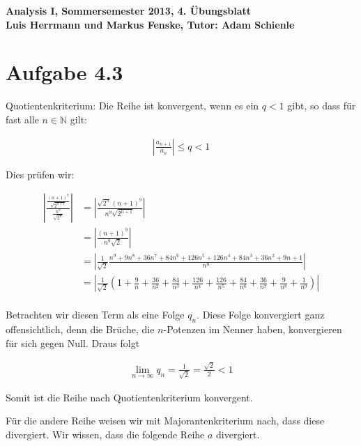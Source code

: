 \documentclass[a4paper,german,12pt,smallheadings]{scrartcl}
\begin{document}
\begin{center}
\bfseries %
\sffamily %
\vspace{-40pt}
Analysis I, Sommersemester 2013, 4. Übungsblatt \\
Luis Herrmann und Markus Fenske, Tutor: Adam Schienle
\vspace{-10pt}
\end{center}

\section*{Aufgabe 4.3}
Quotientenkriterium: Die Reihe ist konvergent, wenn es ein $q < 1$ gibt, so
dass für fast alle $n \in \mathbb{N}$ gilt:

\begin{align*}
  \left| \frac{a_{n+1}}{a_n} \right| \le q < 1
\end{align*}

Dies prüfen wir:

\begin{align*}
  \left| \frac{\frac{(n+1)^9}{\sqrt{2^{n+1}}}}{\frac{n^9}{\sqrt{2^n}}} \right| &= \left| \frac{\sqrt{2^n} (n+1)^9}{n^9 \sqrt{2^{n+1}}} \right| \\
  &= \left| \frac{(n+1)^9}{n^9 \sqrt{2}} \right| \\
  &= \left| \frac{1}{\sqrt{2}} \frac{n^9+9n^8+36n^7+84n^6+126n^5+126n^4+84n^3+36n^2+9n+1}{n^9} \right| \\
  &= \left| \frac{1}{\sqrt{2}} \left(1 + \frac{9}{n} + \frac{36}{n^2} + \frac{84}{n^3} + \frac{126}{n^4} + \frac{126}{n^5} + \frac{84}{n^6} + \frac{36}{n^7} + \frac{9}{n^8} + \frac{1}{n^9}\right) \right| \\
\end{align*}

Betrachten wir diesen Term als eine Folge $q_n$. Diese Folge konvergiert ganz
offensichtlich, denn die Brüche, die $n$-Potenzen im Nenner haben, konvergieren
für sich gegen Null. Draus folgt

\begin{align*}
  \lim_{n \to \infty} q_n = \frac{1}{\sqrt{2}} = \frac{\sqrt{2}}{2} < 1
\end{align*}

Somit ist die Reihe nach Quotientenkriterium konvergent.

Für die andere Reihe weisen wir mit Majorantenkriterium nach, dass diese divergiert. Wir wissen, dass die folgende Reihe $a$ divergiert.
\end{document}
